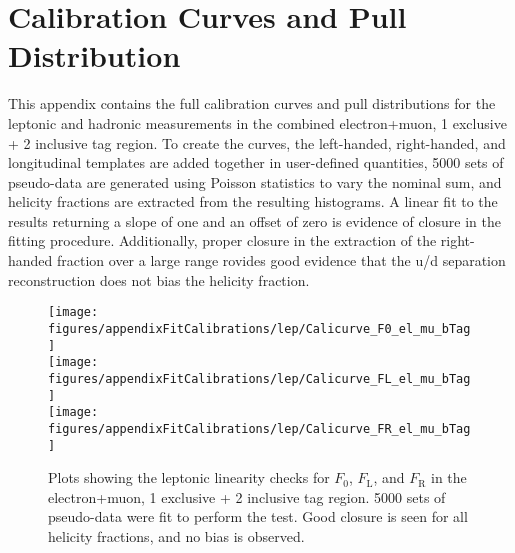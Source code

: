 \clearpage
\section{Calibration Curves and Pull Distribution}
\label{app:fitCalibrations}
This appendix contains the full calibration curves and pull distributions for the leptonic and hadronic measurements in the combined electron+muon, 1 exclusive + 2 inclusive \bt tag region. To create the curves, the left-handed, right-handed, and longitudinal templates are added together in user-defined quantities, 5000 sets of pseudo-data are generated using Poisson statistics to vary the nominal sum, and helicity fractions are extracted from the resulting histograms. A linear fit to the results returning a slope of one and an offset of zero is evidence of closure in the fitting procedure. Additionally, proper closure in the extraction of the right-handed fraction over a large range rovides good evidence that the u/d separation reconstruction does not bias the helicity fraction. 


     \begin{figure}[!hb]    
      \begin{center}         
        \texttt{[image: figures/appendixFitCalibrations/lep/Calicurve\_F0\_el\_mu\_bTag]}\\
        \texttt{[image: figures/appendixFitCalibrations/lep/Calicurve\_FL\_el\_mu\_bTag]}\\
        \texttt{[image: figures/appendixFitCalibrations/lep/Calicurve\_FR\_el\_mu\_bTag]}\\
        \caption{Plots showing the leptonic linearity checks for $F_{\text{0}}$, $F_{\text{L}}$, and $F_{\text{R}}$ in the electron+muon, 1 exclusive + 2 inclusive \bt tag region. 5000 sets of pseudo-data were fit to perform the test. Good closure is seen for all helicity fractions, and no bias is observed.}
	\label{fig:calibrationCurves_leptonic}
      \end{center}
     \end{figure}

